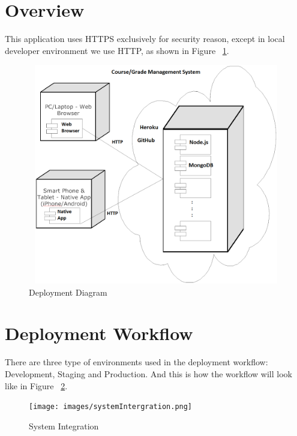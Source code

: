 
\section{Overview}
This application uses HTTPS exclusively for security reason, except in local developer environment we use HTTP, as shown in Figure ~\ref{fig:deployment}.

\vspace{3em}
\begin{figure}[H]
\begin{center}
\includegraphics[height=3.8in,width=6.5in]{images/deployment.png}
\caption{Deployment Diagram}
\label{fig:deployment}
\end{center}
\end{figure}

\section{Deployment Workflow}
There are three type of environments used in the deployment workflow: Development, Staging and Production. And this is how the workflow will look like in Figure  ~\ref{fig:system-integration}.

\vspace{3em}
\begin{figure}[H]
\begin{center}
\texttt{[image: images/systemIntergration.png]}
\caption{System Integration}
\label{fig:system-integration}
\end{center}
\end{figure}

